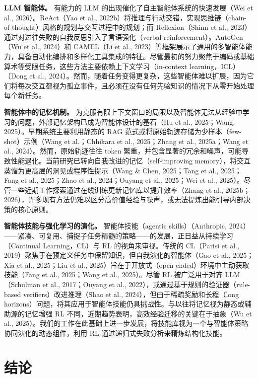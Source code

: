 \documentclass[11pt,UTF8,fontset=fandol]{ctexart}
\begin{document}
\textbf{LLM 智能体。} 有能力的 LLM 的出现催化了自主智能体系统的快速发展（Wei et al., 2026）。ReAct（Yao et al., 2022b）将推理与行动交错，实现思维链（chain-of-thought）风格的规划与交互过程中的规划；而 Reflexion（Shinn et al., 2023）通过对过往失败的自我反思引入了言语强化（verbal reinforcement）。AutoGen（Wu et al., 2024）和 CAMEL（Li et al., 2023）等框架展示了通用的多智能体能力，具备自动化编排和多样化工具集成的特征。尽管最初的努力聚焦于编码或基础算术等受限任务，这些方法主要依赖上下文学习（in-context learning，ICL）（Dong et al., 2024）。然而，随着任务变得更复杂，这些智能体难以扩展，因为它们将每次交互都视为孤立事件，且必须在没有任何先验知识的情况下从零开始处理每个新任务。

\textbf{智能体中的记忆机制。} 为克服有限上下文窗口的局限以及智能体无法从经验中学习的问题，外部记忆架构已成为智能体设计的基石（Hu et al., 2025；Wang, 2025）。早期系统主要利用静态的 RAG 范式或将原始轨迹存储为少样本（few-shot）示例（Wang et al.；Chhikara et al., 2025；Zhang et al., 2025a；Wang et al., 2024）。然而，原始轨迹往往 token 繁重，并包含显著的冗余和噪声，可能导致性能退化。当前研究已转向自我改进的记忆（self-improving memory），将交互蒸馏为更高层的洞见或程序性提示（Wang \& Chen, 2025；Tang et al., 2025；Fang et al., 2025；Zhao et al., 2024；Ouyang et al., 2025；Wei et al., 2025）。尽管一些近期工作探索通过在线训练更新记忆库以提升效率（Zhang et al., 2025b；2026），许多现有方法仍难以区分高价值经验与噪声，或无法提炼出能引导内部决策的核心原则。

\textbf{智能体技能与强化学习的演化。} 智能体技能（agentic skills）（Anthropic, 2024）——紧凑、可复用、捕捉子任务精髓的策略——的发展，正日益从持续学习（Continual Learning，CL）与 RL 的视角来审视。传统的 CL（Parisi et al., 2019）聚焦于在预定义任务中保留知识，但自我演化的智能体（Gao et al., 2025；Xia et al., 2025；Liu et al., 2025）旨在于开放式（open-ended）环境中主动获取技能（Fang et al., 2025；Wang et al., 2025）。尽管 RL 被广泛用于对齐 LLM（Schulman et al., 2017；Ouyang et al., 2022），或通过基于规则的验证器（rule-based verifiers）改进推理（Shao et al., 2024），但由于稀疏奖励和长程（long horizons）问题，将其应用于智能体技能仍具挑战性。与以往将记忆视为静态或辅助源的记忆增强 RL 不同，近期趋势表明，高效经验迁移的关键在于抽象（Wu et al., 2025）。我们的工作在此基础上进一步发展，将技能库视为一个与智能体策略协同演化的动态组件，利用 RL 通过递归式失败分析来精炼结构化技能。

\section{结论}
\end{document}

